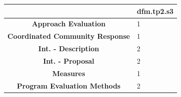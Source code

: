 \documentclass[]{tufte-handout}
\begin{document}
\begin{longtable}[]{@{}cl@{}}
\toprule
\begin{minipage}[b]{0.56\columnwidth}\centering\strut
~\strut
\end{minipage} & \begin{minipage}[b]{0.16\columnwidth}\raggedright\strut
dfm.tp2.s3\strut
\end{minipage}\tabularnewline
\midrule
\endhead
\begin{minipage}[t]{0.56\columnwidth}\centering\strut
\textbf{Approach Evaluation}\strut
\end{minipage} & \begin{minipage}[t]{0.16\columnwidth}\raggedright\strut
1\strut
\end{minipage}\tabularnewline
\begin{minipage}[t]{0.56\columnwidth}\centering\strut
\textbf{Coordinated Community Response}\strut
\end{minipage} & \begin{minipage}[t]{0.16\columnwidth}\raggedright\strut
1\strut
\end{minipage}\tabularnewline
\begin{minipage}[t]{0.56\columnwidth}\centering\strut
\textbf{Int. - Description}\strut
\end{minipage} & \begin{minipage}[t]{0.16\columnwidth}\raggedright\strut
2\strut
\end{minipage}\tabularnewline
\begin{minipage}[t]{0.56\columnwidth}\centering\strut
\textbf{Int. - Proposal}\strut
\end{minipage} & \begin{minipage}[t]{0.16\columnwidth}\raggedright\strut
2\strut
\end{minipage}\tabularnewline
\begin{minipage}[t]{0.56\columnwidth}\centering\strut
\textbf{Measures}\strut
\end{minipage} & \begin{minipage}[t]{0.16\columnwidth}\raggedright\strut
1\strut
\end{minipage}\tabularnewline
\begin{minipage}[t]{0.56\columnwidth}\centering\strut
\textbf{Program Evaluation Methods}\strut
\end{minipage} & \begin{minipage}[t]{0.16\columnwidth}\raggedright\strut
2\strut
\end{minipage}\tabularnewline

\end{longtable}
\end{document}
